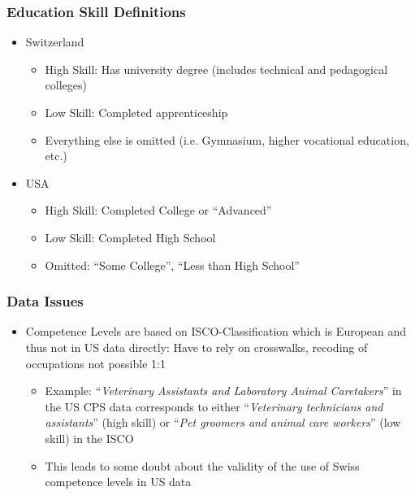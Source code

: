 \documentclass[11pt]{beamer} \usetheme{Frankfurt}
\begin{document}
\begin{frame}
  \frametitle{Education Skill Definitions }
  \begin{itemize}
  \item Switzerland
    \begin{itemize}
    \item High Skill: Has university degree (includes technical and
      pedagogical colleges)
    \item Low Skill: Completed apprenticeship
    \item Everything else is omitted (i.e. Gymnasium, higher
      vocational education, etc.)
    \end{itemize}
  \item USA
    \begin{itemize}
    \item High Skill: Completed College or ``Advanced''
    \item Low Skill: Completed High School
    \item Omitted: ``Some College'', ``Less than High School''
    \end{itemize}
  \end{itemize}
\end{frame}
\begin{frame}
  \frametitle{Data Issues}
  \begin{itemize}
  \item Competence Levels are based on ISCO-Classification which is
    European and thus not in US data directly: Have to rely on
    crosswalks, recoding of occupations
    not possible 1:1
    \begin{itemize}
    \item Example: ``\emph{Veterinary Assistants and Laboratory Animal
      Caretakers}'' in the US CPS data corresponds to either ``\emph{Veterinary
      technicians and assistants}'' (high skill) or ``\emph{Pet groomers and
      animal care workers}'' (low skill) in the ISCO
    \item This leads to some doubt about the validity of the use of
      Swiss competence levels in US data
    \end{itemize}
  \end{itemize}
\end{frame}
\end{document}
